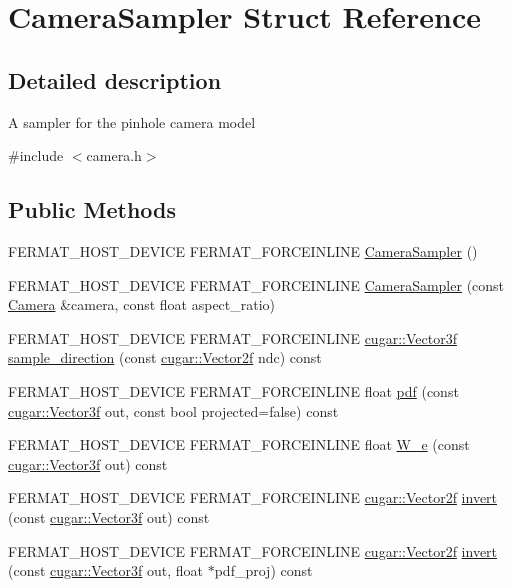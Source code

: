 \hypertarget{struct_camera_sampler}{}\section{Camera\+Sampler Struct Reference}
\label{struct_camera_sampler}


\subsection{Detailed description}
A sampler for the pinhole camera model 

{\ttfamily \#include $<$camera.\+h$>$}

\subsection*{Public Methods}
\begin{DoxyCompactItemize}
\item 
F\+E\+R\+M\+A\+T\+\_\+\+H\+O\+S\+T\+\_\+\+D\+E\+V\+I\+CE F\+E\+R\+M\+A\+T\+\_\+\+F\+O\+R\+C\+E\+I\+N\+L\+I\+NE \hyperlink{struct_camera_sampler_a50332d884a007ab1ffcb05215af5d92a}{Camera\+Sampler} ()
\item 
F\+E\+R\+M\+A\+T\+\_\+\+H\+O\+S\+T\+\_\+\+D\+E\+V\+I\+CE F\+E\+R\+M\+A\+T\+\_\+\+F\+O\+R\+C\+E\+I\+N\+L\+I\+NE \hyperlink{struct_camera_sampler_a9d018f4ac9bbd0e93bfcc283ab915eeb}{Camera\+Sampler} (const \hyperlink{struct_camera}{Camera} \&camera, const float aspect\+\_\+ratio)
\item 
F\+E\+R\+M\+A\+T\+\_\+\+H\+O\+S\+T\+\_\+\+D\+E\+V\+I\+CE F\+E\+R\+M\+A\+T\+\_\+\+F\+O\+R\+C\+E\+I\+N\+L\+I\+NE \hyperlink{structcugar_1_1_vector}{cugar\+::\+Vector3f} \hyperlink{struct_camera_sampler_ac502e1699c99c595b773b1419225fe32}{sample\+\_\+direction} (const \hyperlink{structcugar_1_1_vector}{cugar\+::\+Vector2f} ndc) const
\item 
F\+E\+R\+M\+A\+T\+\_\+\+H\+O\+S\+T\+\_\+\+D\+E\+V\+I\+CE F\+E\+R\+M\+A\+T\+\_\+\+F\+O\+R\+C\+E\+I\+N\+L\+I\+NE float \hyperlink{struct_camera_sampler_a0edd94ccee6da3180f13845d189bc758}{pdf} (const \hyperlink{structcugar_1_1_vector}{cugar\+::\+Vector3f} out, const bool projected=false) const
\item 
F\+E\+R\+M\+A\+T\+\_\+\+H\+O\+S\+T\+\_\+\+D\+E\+V\+I\+CE F\+E\+R\+M\+A\+T\+\_\+\+F\+O\+R\+C\+E\+I\+N\+L\+I\+NE float \hyperlink{struct_camera_sampler_afe4852bed67331cf757518e046d82ef1}{W\+\_\+e} (const \hyperlink{structcugar_1_1_vector}{cugar\+::\+Vector3f} out) const
\item 
F\+E\+R\+M\+A\+T\+\_\+\+H\+O\+S\+T\+\_\+\+D\+E\+V\+I\+CE F\+E\+R\+M\+A\+T\+\_\+\+F\+O\+R\+C\+E\+I\+N\+L\+I\+NE \hyperlink{structcugar_1_1_vector}{cugar\+::\+Vector2f} \hyperlink{struct_camera_sampler_a347623323319a7111f933d4af6ac2d19}{invert} (const \hyperlink{structcugar_1_1_vector}{cugar\+::\+Vector3f} out) const
\item 
F\+E\+R\+M\+A\+T\+\_\+\+H\+O\+S\+T\+\_\+\+D\+E\+V\+I\+CE F\+E\+R\+M\+A\+T\+\_\+\+F\+O\+R\+C\+E\+I\+N\+L\+I\+NE \hyperlink{structcugar_1_1_vector}{cugar\+::\+Vector2f} \hyperlink{struct_camera_sampler_aaa68e077536fc88429fb35dd04d30af1}{invert} (const \hyperlink{structcugar_1_1_vector}{cugar\+::\+Vector3f} out, float $\ast$pdf\+\_\+proj) const
\end{DoxyCompactItemize}
